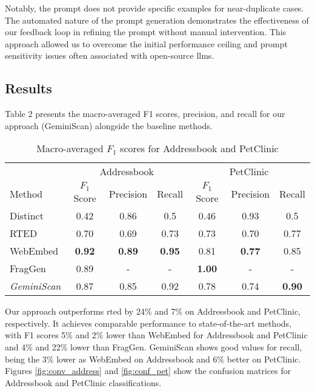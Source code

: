         Notably, the prompt does not provide specific examples for near-duplicate cases. 
        The automated nature of the prompt generation demonstrates the effectiveness of our feedback loop in refining the prompt without manual intervention. This approach allowed us to overcome the initial performance ceiling and prompt sensitivity issues often associated with open-source \acp{llm}.
    
    \subsection{Results}
        \label{sec:eval:sub:result}

        Table 2 presents the macro-averaged F1 scores, precision, and recall for our approach (GeminiScan) alongside the baseline methods.

        \begin{table}[htbp]
            \centering
            \label{table:f1}
            \begin{tabular}{lcccccc}
                \hline
                & \multicolumn{3}{c}{Addressbook} & \multicolumn{3}{c}{PetClinic} \\ \cline{2-4} \cline{5-7}
                Method              & $F_1$ Score   & Precision     & Recall        & $F_1$ Score   & Precision     & Recall        \\ \hline
                Distinct            & 0.42          & 0.86          & 0.5           & 0.46          & 0.93          & 0.5           \\
                RTED                & 0.70          & 0.69          & 0.73          & 0.73          & 0.70          & 0.77          \\
                WebEmbed            & \textbf{0.92} & \textbf{0.89} & \textbf{0.95} & 0.81          & \textbf{0.77} & 0.85          \\
                FragGen             & 0.89          & -             & -             & \textbf{1.00} & -             & -             \\
                \textit{GeminiScan} & 0.87          & 0.85          & 0.92          & 0.78          & 0.74          & \textbf{0.90} \\ \hline
            \end{tabular}
            \caption{Macro-averaged $F_1$ scores for Addressbook and PetClinic}
        \end{table}

        Our approach outperforms \ac{rted} by 24\% and 7\% on Addressbook and PetClinic, respectively. It achieves comparable performance to state-of-the-art methods, with F1 scores 5\% and 2\% lower than WebEmbed for Addressbook and PetClinic and 4\% and 22\% lower than FragGen. GeminiScan shows good values for recall, being the 3\% lower as WebEmbed on Addressbook and 6\% better on PetClinic.
        Figures \ref{fig:conv_address} and \ref{fig:conf_pet} show the confusion matrices for Addressbook and PetClinic classifications.

